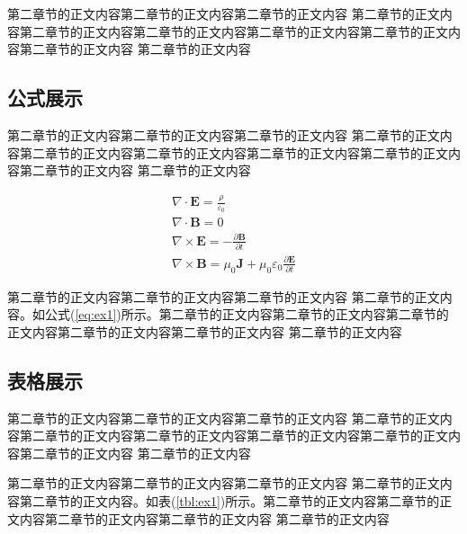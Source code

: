 \documentclass{yacauthesisug}
\begin{document}
第二章节的正文内容第二章节的正文内容第二章节的正文内容
第二章节的正文内容第二章节的正文内容第二章节的正文内容第二章节的正文内容第二章节的正文内容第二章节的正文内容
第二章节的正文内容

\subsection{公式展示}

第二章节的正文内容第二章节的正文内容第二章节的正文内容
第二章节的正文内容第二章节的正文内容第二章节的正文内容第二章节的正文内容第二章节的正文内容第二章节的正文内容
第二章节的正文内容

\begin{equation} \label{eq:ex1}
  \begin{array}{l}
    \nabla \cdot \mathbf{E} = \frac{\rho}{\varepsilon _0}  \\
    \nabla \cdot \mathbf{B} = 0 \\
    \nabla \times  \mathbf{E} = -\frac{\partial \mathbf{B}}{\partial t }  \\
    \nabla \times  \mathbf{B} = \mu _0\mathbf{J} + \mu _0\varepsilon_0 \frac{\partial \mathbf{E}}{\partial t }
  \end{array}
\end{equation}

第二章节的正文内容第二章节的正文内容第二章节的正文内容
第二章节的正文内容。如公式(\ref{eq:ex1})所示。第二章节的正文内容第二章节的正文内容第二章节的正文内容第二章节的正文内容第二章节的正文内容
第二章节的正文内容

\subsection{表格展示}

第二章节的正文内容第二章节的正文内容第二章节的正文内容
第二章节的正文内容第二章节的正文内容第二章节的正文内容第二章节的正文内容第二章节的正文内容第二章节的正文内容
第二章节的正文内容


第二章节的正文内容第二章节的正文内容第二章节的正文内容
第二章节的正文内容第二章节的正文内容。如表(\ref{tbl:ex1})所示。第二章节的正文内容第二章节的正文内容第二章节的正文内容第二章节的正文内容
第二章节的正文内容
\end{document}
